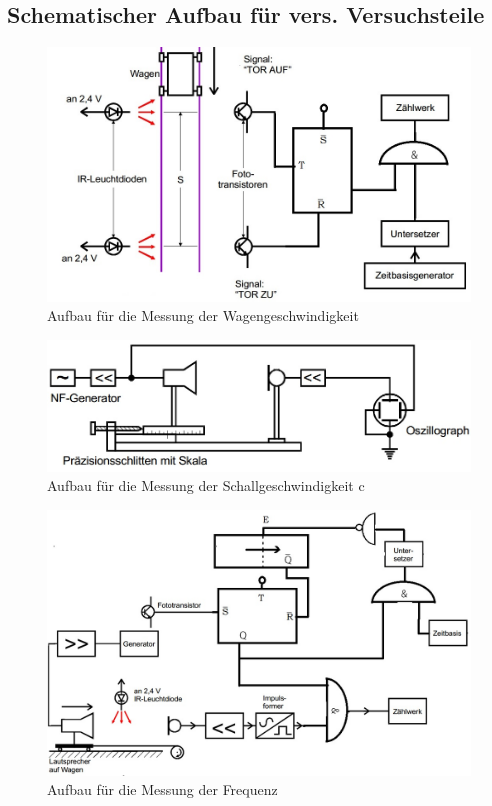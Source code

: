 \subsection{Schematischer Aufbau für vers. Versuchsteile}
\begin{figure}[h]
  \centering
  \includegraphics[width=1\textwidth]{Grafiken/V104_Abb1.jpg}
  \caption{Aufbau für die Messung der Wagengeschwindigkeit}
  \label{fig:V104_Abb1}
\end{figure}
\begin{figure}[h]
  \centering
  \includegraphics[width=1\textwidth]{Grafiken/V104_Abb2.jpg}
  \caption{Aufbau für die Messung der Schallgeschwindigkeit c}
  \label{fig:V104_Abb2}
\end{figure}
\begin{figure}[h]
  \centering
  \includegraphics[width=1\textwidth]{Grafiken/V104_Abb3.jpg}
  \caption{Aufbau für die Messung der Frequenz}
  \label{fig:V104_Abb3}
\end{figure}
